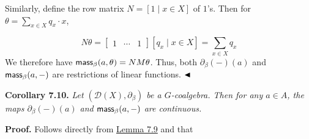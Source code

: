 \hypertarget{html:S7.SS0.SSS0.P0.SPx5.p2}{} Similarly, define the row matrix %
\hypertarget{html:S7.SS0.SSS0.P0.SPx5.p2.m1}{}\({N=[1\mid x\in X]}\) of %
\hypertarget{html:S7.SS0.SSS0.P0.SPx5.p2.m2}{}\({1}\)’s. Then for %
\hypertarget{html:S7.SS0.SSS0.P0.SPx5.p2.m3}{}\({\theta=\sum_{x\in X}q_{x}\cdot x}\),
\par\medskip
\hypertarget{html:S7.Ex6}{}   %
\hypertarget{html:S7.Ex6.m1}{}\[N\theta=\begin{bmatrix}1&\cdots&1\end{bmatrix}[q_{x}\mid x\in X]=\sum_{x\in X}q_{x}\]    We therefore have %
\hypertarget{html:S7.SS0.SSS0.P0.SPx5.p2.m4}{}\({\mbox{\sf mass}_{\beta}(a,\theta)=NM\theta}\). Thus, both %
\hypertarget{html:S7.SS0.SSS0.P0.SPx5.p2.m5}{}\({\partial_{\beta}(-)(a)}\) and %
\hypertarget{html:S7.SS0.SSS0.P0.SPx5.p2.m6}{}\({\mbox{\sf mass}_{\beta}(a,-)}\) are restrictions of linear functions. %
\hypertarget{html:S7.SS0.SSS0.P0.SPx5.p2.m7}{}\({\hfill\blacktriangleleft}\)
\par\medskip
\hypertarget{html:S7.Thmtheorem10}{} \par\noindent\textbf{\textbf{Corollary 7.10}\textbf{.}}\quad  %
\hypertarget{html:S7.Thmtheorem10.p1}{} \emph{Let %
\hypertarget{html:S7.Thmtheorem10.p1.m1}{}\({({\mathcal{D}}(X),\partial_{\beta})}\) be a %
\hypertarget{html:S7.Thmtheorem10.p1.m2}{}\({G}\)-coalgebra. Then for any %
\hypertarget{html:S7.Thmtheorem10.p1.m3}{}\({a\in A}\), the maps %
\hypertarget{html:S7.Thmtheorem10.p1.m4}{}\({\partial_{\beta}(-)(a)}\) and %
\hypertarget{html:S7.Thmtheorem10.p1.m5}{}\({\mbox{\sf mass}_{\beta}(a,-)}\) are continuous.}
\par\medskip
\hypertarget{html:S7.SS0.SSS0.P0.SPx6}{} \par\noindent\textbf{Proof.}\quad  %
\hypertarget{html:S7.SS0.SSS0.P0.SPx6.p1}{} Follows directly from \hyperlink{html:S7.Thmtheorem9}{Lemma 7.9} and that %
